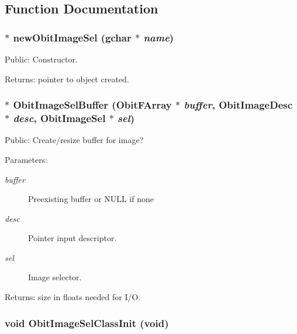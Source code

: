 \subsection{Function Documentation}
\subsubsection{$\ast$ new\-Obit\-Image\-Sel (gchar $\ast$ {\em name})}\label{ObitImageSel_8h_a5}


Public: Constructor. 

\begin{Desc}
\item[Returns:]pointer to object created. \end{Desc}
\subsubsection{$\ast$ Obit\-Image\-Sel\-Buffer ({\bf Obit\-FArray} $\ast$ {\em buffer}, {\bf Obit\-Image\-Desc} $\ast$ {\em desc}, {\bf Obit\-Image\-Sel} $\ast$ {\em sel})}\label{ObitImageSel_8h_a8}


Public: Create/resize buffer for image? 

\begin{Desc}
\item[Parameters:]
\begin{description}
\item[{\em buffer}]Preexisting buffer or NULL if none \item[{\em desc}]Pointer input descriptor. \item[{\em sel}]Image selector. \end{description}
\end{Desc}
\begin{Desc}
\item[Returns:]size in floats needed for I/O. \end{Desc}
\subsubsection{\setlength{\rightskip}{0pt plus 5cm}void Obit\-Image\-Sel\-Class\-Init (void)}\label{ObitImageSel_8h_a4}


